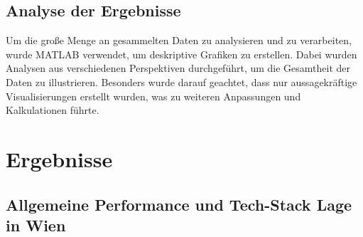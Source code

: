\documentclass[Bachelor,BIF,german,IEEE]{BASE/twbook}
\begin{document}
\subsection{Analyse der Ergebnisse}
Um die große Menge an gesammelten Daten zu analysieren und zu verarbeiten, wurde MATLAB verwendet, um deskriptive Grafiken zu erstellen. Dabei wurden Analysen aus verschiedenen Perspektiven durchgeführt, um die Gesamtheit der Daten zu illustrieren. Besonders wurde darauf geachtet, dass nur aussagekräftige Visualisierungen erstellt wurden, was zu weiteren Anpassungen und Kalkulationen führte.

\clearpage  


\section{Ergebnisse}
\subsection{Allgemeine Performance und Tech-Stack Lage in Wien}
\end{document}
